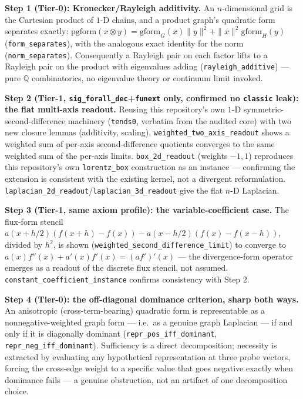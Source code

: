 \documentclass[10pt,twocolumn]{article}
\begin{document}
\textbf{Step 1 (Tier-0): Kronecker/Rayleigh additivity.} An $n$-dimensional grid is
the Cartesian product of $1$-D chains, and a product graph's quadratic form
separates exactly: $\mathrm{pgform}(x\otimes y) =
\mathrm{gform}_G(x)\|y\|^2+\|x\|^2\mathrm{gform}_H(y)$
(\texttt{form\_separates}), with the analogous exact identity for the norm
(\texttt{norm\_separates}). Consequently a Rayleigh pair on each factor lifts to a
Rayleigh pair on the product with eigenvalues adding (\texttt{rayleigh\_additive})
--- pure $\mathbb{Q}$ combinatorics, no eigenvalue theory or continuum limit
invoked.

\textbf{Step 2 (Tier-1, \texttt{sig\_forall\_dec}+\texttt{funext} only, confirmed
no \texttt{classic} leak): the flat multi-axis readout.} Reusing this repository's
own $1$-D symmetric-second-difference machinery (\texttt{tends0}, verbatim from
the audited core) with two new closure lemmas (additivity, scaling),
\texttt{weighted\_two\_axis\_readout} shows a weighted sum of per-axis
second-difference quotients converges to the same weighted sum of the per-axis
limits. \texttt{box\_2d\_readout} (weights $-1,1$) reproduces this repository's
own \texttt{lorentz\_box} construction as an instance --- confirming the extension
is consistent with the existing kernel, not a divergent reformulation.
\texttt{laplacian\_2d\_readout}/\texttt{laplacian\_3d\_readout} give the flat
$n$-D Laplacian.

\textbf{Step 3 (Tier-1, same axiom profile): the variable-coefficient case.} The
flux-form stencil $a(x{+}h/2)(f(x{+}h){-}f(x)) - a(x{-}h/2)(f(x){-}f(x{-}h))$,
divided by $h^2$, is shown (\texttt{weighted\_second\_difference\_limit}) to
converge to $a(x)f''(x)+a'(x)f'(x) = (af')'(x)$ --- the divergence-form operator
emerges as a readout of the discrete flux stencil, not assumed.
\texttt{constant\_coefficient\_instance} confirms consistency with Step 2.

\textbf{Step 4 (Tier-0): the off-diagonal dominance criterion, sharp both ways.}
An anisotropic (cross-term-bearing) quadratic form is representable as a
nonnegative-weighted graph form --- i.e.\ as a genuine graph Laplacian --- if and
only if it is diagonally dominant (\texttt{repr\_pos\_iff\_dominant},
\texttt{repr\_neg\_iff\_dominant}). Sufficiency is a direct decomposition;
necessity is extracted by evaluating any hypothetical representation at three
probe vectors, forcing the cross-edge weight to a specific value that goes
negative exactly when dominance fails --- a genuine obstruction, not an artifact
of one decomposition choice.
\end{document}
